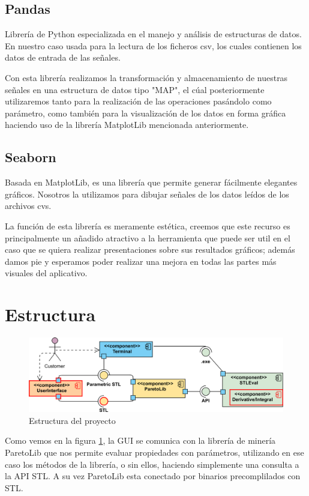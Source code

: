  
 
\subsection{Pandas}
Librería de Python especializada en el manejo y análisis de estructuras de datos. En nuestro caso usada para la lectura de los ficheros csv, los cuales contienen los datos de entrada de las señales.

Con esta librería realizamos la transformación y almacenamiento de nuestras señales en una estructura de datos tipo "MAP", el cúal posteriormente utilizaremos tanto para la realización de las operaciones pasándolo como parámetro, como también para la visualización de los datos en forma gráfica haciendo uso de la librería MatplotLib mencionada anteriormente. 
 
 

\subsection{Seaborn} 
Basada en MatplotLib, es una librería que permite generar fácilmente elegantes gráficos. Nosotros la utilizamos para dibujar señales de los datos leídos de los archivos cvs.

La función de esta librería es meramente estética, creemos que este recurso es principalmente un añadido atractivo a la herramienta que puede ser util en el caso que se quiera realizar presentaciones sobre sus resultados gráficos; además damos pie y esperamos poder realizar una mejora en todas las partes más visuales del aplicativo. 
 
 

\section{Estructura}
\begin{figure}[htb]
\centering
  \includegraphics[width=.95\linewidth]{images/uml_diagram} 
\caption{Estructura del proyecto}
\label{fig:est}
\end{figure}
Como vemos en la figura \ref{fig:est}, la GUI se comunica con la librería de minería ParetoLib que nos permite evaluar propiedades con parámetros, utilizando en ese caso los métodos de la librería, o sin ellos, haciendo simplemente una consulta a la API STL. A su vez ParetoLib esta conectado por binarios precomplilados con STL.


